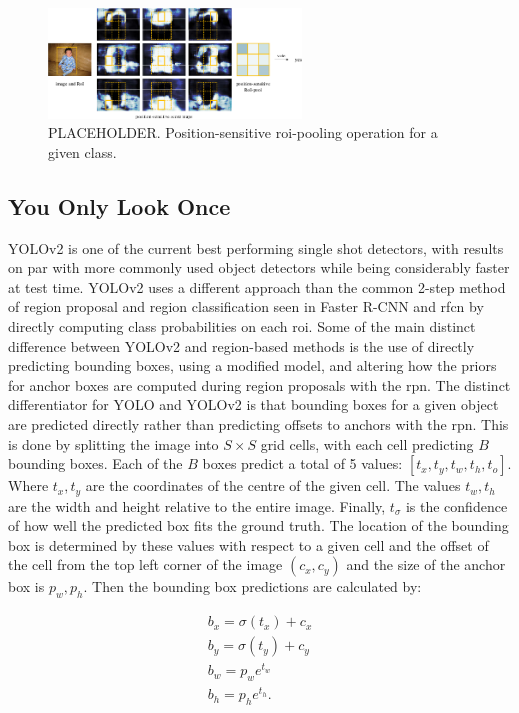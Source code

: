 \begin{figure}[H]
  \centering
    \includegraphics[width=0.6\textwidth]{Figs/Techanal/rfcnpooling.png}
      \caption{PLACEHOLDER. Position-sensitive \gls{roi}-pooling operation for a given class.}
    \label{fig:rfcnpooling}
\end{figure}

\subsection{You Only Look Once}
YOLOv2 \cite{yolov2} is one of the current best performing single shot detectors, with results on par with more commonly used object detectors while being considerably faster at test time. YOLOv2 uses a different approach than the common 2-step method of region proposal and region classification seen in Faster R-CNN and \gls{rfcn} by directly computing class probabilities on each \gls{roi}. Some of the main distinct difference between YOLOv2 and region-based methods is the use of directly predicting bounding boxes, using a modified model, and altering how the priors for anchor boxes are computed during region proposals with the \gls{rpn}. The distinct differentiator for YOLO and YOLOv2 is that bounding boxes for a given object are predicted directly rather than predicting offsets to anchors with the \gls{rpn}. This is done by splitting the image into $S \times S$ grid cells, with each cell predicting $B$ bounding boxes. Each of the $B$ boxes predict a total of 5 values: $[t_x, t_y, t_w, t_h, t_o]$. Where $t_x, t_y$ are the coordinates of the centre of the given cell. The values $t_w, t_h$ are the width and height relative to the entire image. Finally, $t_\sigma$ is the confidence of how well the predicted box fits the ground truth. The location of the bounding box is determined by these values with respect to a given cell and the offset of the cell from the top left corner of the image $(c_x, c_y)$ and the size of the anchor box is $p_w, p_h$. Then the bounding box predictions are calculated by:

\begin{equation}
\begin{split}
  b_x = \sigma(t_x) + c_x \\
  b_y = \sigma(t_y) + c_y \\
  b_w = p_we^{t_w} \\
  b_h = p_he^{t_h}.
\end{split}
\end{equation}

